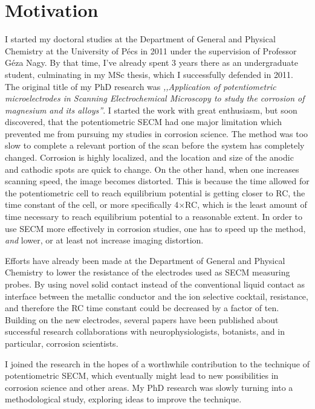\chapter*{Motivation}
I started my doctoral studies at the Department of General and Physical Chemistry at the University of Pécs in 2011 under the supervision of Professor Géza Nagy.
By that time, I've already spent 3 years there as an undergraduate student, culminating in my MSc thesis, which I successfully defended in 2011.
The original title of my PhD research was \emph{,,Application of potentiometric microelectrodes in Scanning Electrochemical Microscopy to study the corrosion of magnesium and its alloys''}.
I started the work with great enthusiasm, but soon discovered, that the potentiometric SECM had one major limitation which prevented me from pursuing my studies in corrosion science.
The method was too slow to complete a relevant portion of the scan before the system has completely changed.
Corrosion is highly localized, and the location and size of the anodic and cathodic spots are quick to change.
On the other hand, when one increases scanning speed, the image becomes distorted.
This is because the time allowed for the potentiometric cell to reach equilibrium potential is getting closer to RC, the time constant of the cell, or more specifically 4$\times$RC, which is the least amount of time necessary to reach equilibrium potential to a reasonable extent.
In order to use SECM more effectively in corrosion studies, one has to speed up the method, \emph{and} lower, or at least not increase imaging distortion.

Efforts have already been made at the Department of General and Physical Chemistry to lower the resistance of the electrodes used as SECM measuring probes.
By using novel solid contact instead of the conventional liquid contact as interface between the metallic conductor and the ion selective cocktail, resistance, and therefore the RC time constant could be decreased by a factor of ten.
Building on the new electrodes, several papers have been published about successful research collaborations with neurophysiologists, botanists, and in particular, corrosion scientists.

I joined the research in the hopes of a worthwhile contribution to the technique of potentiometric SECM, which eventually might lead to new possibilities in corrosion science and other areas.
My PhD research was slowly turning into a methodological study, exploring ideas to improve the technique.


